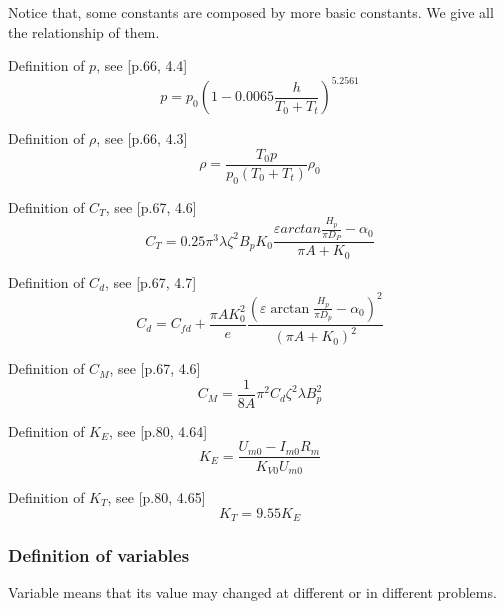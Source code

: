 \documentclass{article} %
\numberwithin{equation}{section} %
\begin{document}
Notice that, some constants are composed by more basic constants. We give all the relationship of them.

Definition of $p$, see \cite{qq}[p.66, 4.4]
\begin{equation}
p=p_0 \left( 1-0.0065 \frac {h}{T_0+T_t } \right)  ^{5.2561} \label{basic.p}
\end{equation}

Definition of $\rho$, see \cite{qq}[p.66, 4.3]
\begin{equation}
\rho=\frac {T_0 p}{p_0 (T_0+T_t) } \rho_0 \label{basic.rho_0}
\end{equation}

Definition of $C_T$, see \cite{qq}[p.67, 4.6]
\begin{equation}
C_T = 0.25\pi^3\lambda\zeta^2 B_p K_0 \frac{\varepsilon arctan \frac{H_p}{\pi D_P} - \alpha_0}{\pi A + K_0} \label{basic.C_T}
\end{equation}

Definition of $C_d$, see \cite{qq}[p.67, 4.7]
\begin{equation}
C_d = C_{fd} + \frac {\pi A K_0^2} {e} 
\frac {\left(\varepsilon\arctan{\frac {H_p}{\pi D_p}}-\alpha_0\right)^2} {\left(\pi A + K_0\right)^2} \label{basic.C_d}
\end{equation}

Definition of $C_M$, see \cite{qq}[p.67, 4.6]
\begin{equation}
C_M = \frac{1}{8A}\pi^2 C_d\zeta^2 \lambda B_p^2 \label{basic.C_M}
\end{equation}

Definition of $K_E$, see \cite{qq}[p.80, 4.64]
\begin{equation}
K_{E} = \frac {U_{m0} - I_{m0} R_m} {K_{V0} U_{m0}} \label{basic.K_E}
\end{equation}

Definition of $K_T$, see \cite{qq}[p.80, 4.65]
\begin{equation}
K_{T} = 9.55 K_{E} \label{basic.K_T}
\end{equation}


\subsubsection{Definition of variables}

Variable means that its value may changed at different or in different problems. 
\end{document}
